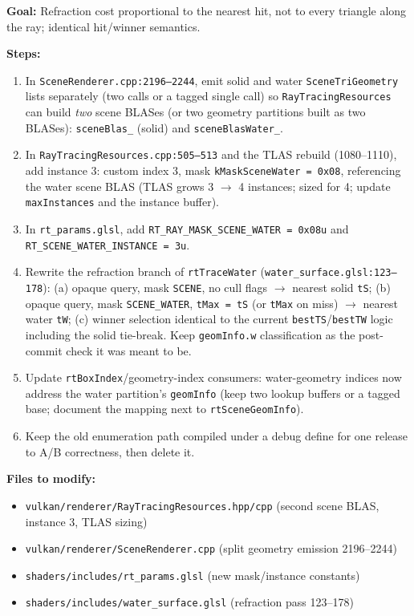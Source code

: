 \documentclass[11pt,a4paper]{article}
\begin{document}
\begin{tcolorbox}[promptbox={Prompt: Split the Scene Instance by Content and Restore Opaque Refraction}]
\textbf{Goal:} Refraction cost proportional to the nearest hit, not to every triangle along the ray; identical hit/winner semantics.

\textbf{Steps:}
\begin{enumerate}
    \item In \texttt{SceneRenderer.cpp:2196--2244}, emit solid and water \texttt{SceneTriGeometry} lists separately (two calls or a tagged single call) so \texttt{RayTracingResources} can build \emph{two} scene BLASes (or two geometry partitions built as two BLASes): \texttt{sceneBlas\_} (solid) and \texttt{sceneBlasWater\_}.
    \item In \texttt{RayTracingResources.cpp:505--513} and the TLAS rebuild (1080--1110), add instance 3: custom index 3, mask \texttt{kMaskSceneWater = 0x08}, referencing the water scene BLAS (TLAS grows 3 $\rightarrow$ 4 instances; sized for 4; update \texttt{maxInstances} and the instance buffer).
    \item In \texttt{rt\_params.glsl}, add \texttt{RT\_RAY\_MASK\_SCENE\_WATER = 0x08u} and \texttt{RT\_SCENE\_WATER\_INSTANCE = 3u}.
    \item Rewrite the refraction branch of \texttt{rtTraceWater} (\texttt{water\_surface.glsl:123--178}): (a) opaque query, mask \texttt{SCENE}, no cull flags $\rightarrow$ nearest solid \texttt{tS}; (b) opaque query, mask \texttt{SCENE\_WATER}, \texttt{tMax = tS} (or \texttt{tMax} on miss) $\rightarrow$ nearest water \texttt{tW}; (c) winner selection identical to the current \texttt{bestTS}/\texttt{bestTW} logic including the solid tie-break. Keep \texttt{geomInfo.w} classification as the post-commit check it was meant to be.
    \item Update \texttt{rtBoxIndex}/geometry-index consumers: water-geometry indices now address the water partition's \texttt{geomInfo} (keep two lookup buffers or a tagged base; document the mapping next to \texttt{rtSceneGeomInfo}).
    \item Keep the old enumeration path compiled under a debug define for one release to A/B correctness, then delete it.
\end{enumerate}

\textbf{Files to modify:}
\begin{itemize}
    \item \texttt{vulkan/renderer/RayTracingResources.hpp/cpp} (second scene BLAS, instance 3, TLAS sizing)
    \item \texttt{vulkan/renderer/SceneRenderer.cpp} (split geometry emission 2196--2244)
    \item \texttt{shaders/includes/rt\_params.glsl} (new mask/instance constants)
    \item \texttt{shaders/includes/water\_surface.glsl} (refraction pass 123--178)
\end{itemize}


\end{tcolorbox}
\end{document}

